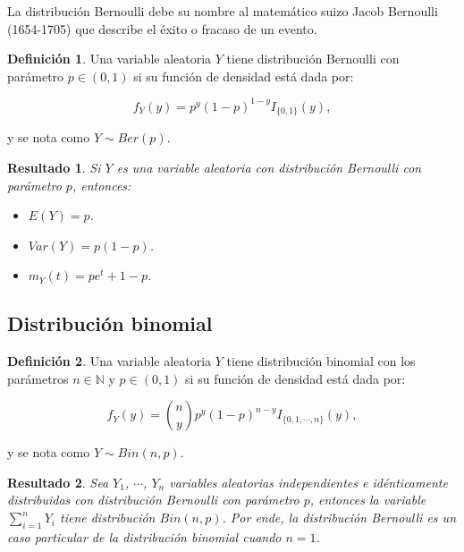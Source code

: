 \documentclass[
  spanish,
]{book}
\providecommand{\tightlist}{%
  \setlength{\itemsep}{0pt}\setlength{\parskip}{0pt}}
\newtheorem{proposition}{Resultado}[chapter]
\theoremstyle{definition}
\newtheorem{definition}{Definición}[chapter]
\theoremstyle{definition}
\theoremstyle{definition}
\theoremstyle{definition}
\theoremstyle{remark}
\begin{document}
La distribución Bernoulli debe su nombre al matemático suizo Jacob Bernoulli (1654-1705) que describe el éxito o fracaso de un evento.

\begin{definition}
\protect\hypertarget{def:unnamed-chunk-5}{}{\label{def:unnamed-chunk-5} }Una variable aleatoria \(Y\) tiene distribución Bernoulli con parámetro \(p\in (0,1)\) si su función de densidad está dada por:

\begin{equation}
f_Y(y)=p^y(1-p)^{1-y}I_{\{0,1\}}(y),
\end{equation}

y se nota como \(Y\sim Ber(p)\).
\end{definition}

\begin{proposition}
\protect\hypertarget{prp:unnamed-chunk-6}{}{\label{prp:unnamed-chunk-6} }Si \(Y\) es una variable aleatoria con distribución Bernoulli con parámetro \(p\), entonces:

\begin{itemize}
\tightlist
\item
  \(E(Y)=p\).
\item
  \(Var(Y)=p(1-p)\).
\item
  \(m_Y(t)=pe^t+1-p\).
\end{itemize}
\end{proposition}

\hypertarget{distribuciuxf3n-binomial}{%
\subsection{Distribución binomial}\label{distribuciuxf3n-binomial}}

\begin{definition}
\protect\hypertarget{def:unnamed-chunk-7}{}{\label{def:unnamed-chunk-7} }Una variable aleatoria \(Y\) tiene distribución binomial con los parámetros \(n\in \mathbb{N}\) y \(p\in (0,1)\) si su función de densidad está dada por:

\begin{equation}
f_Y(y)=\binom{n}{y}p^y(1-p)^{n-y}I_{\{0,1,\cdots,n\}}(y),
\end{equation}

y se nota como \(Y\sim Bin(n,p)\).
\end{definition}

\begin{proposition}
\protect\hypertarget{prp:unnamed-chunk-8}{}{\label{prp:unnamed-chunk-8} }Sea \(Y_1\), \(\cdots\), \(Y_n\) variables aleatorias independientes e idénticamente distribuidas con distribución Bernoulli con parámetro \(p\),
entonces la variable \(\sum_{i=1}^nY_i\) tiene distribución \(Bin(n,p)\). Por ende, la distribución Bernoulli es un caso particular de la distribución binomial cuando \(n=1\).
\end{proposition}
\end{document}
